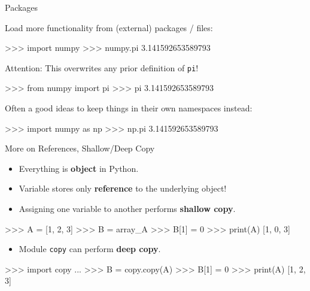 \documentclass[10pt]{beamer}
\begin{document}
\begin{frame}[fragile]{Packages}

    Load more functionality from (external) packages / files:

    \begin{pythoncode}
        >>> import numpy
        >>> numpy.pi
        3.141592653589793
    \end{pythoncode}

    \pause

    Attention: This overwrites any prior definition of \texttt{pi}!
    \begin{pythoncode}
        >>> from numpy import pi
        >>> pi
        3.141592653589793
    \end{pythoncode}

    \pause

    Often a good ideas to keep things in their own namespaces instead:
    \begin{pythoncode}
        >>> import numpy as np
        >>> np.pi
        3.141592653589793
    \end{pythoncode}

\end{frame}

\begin{frame}[fragile]{More on References, Shallow/Deep Copy}
	
	\begin{itemize}
		\item \pause Everything is \textbf{object} in Python.
		\item \pause Variable stores only \textbf{reference} to the underlying object!
		\item \pause Assigning one variable to another performs \textbf{shallow copy}.
	\end{itemize}
	
	\pause
	\begin{pythoncode}
		>>> A = [1, 2, 3]
		>>> B = array_A
		>>> B[1] = 0
		>>> print(A)
		[1, 0, 3]
	\end{pythoncode}
	
	\begin{itemize}
		\item \pause Module \small{\texttt{copy}} can perform \textbf{deep copy}.
	\end{itemize}
	\begin{pythoncode}
		>>> import copy
		...
		>>> B = copy.copy(A)
		>>> B[1] = 0
		>>> print(A)
		[1, 2, 3]
	\end{pythoncode}
\end{frame}
\end{document}
